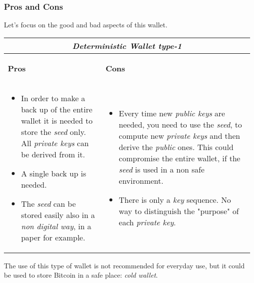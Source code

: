 \subsubsection{Pros and Cons}
Let's focus on the good and bad aspects of this wallet.

\begin{center}
	\begin{tabular}{ |p{6cm}|p{6cm}|  }
		\hline
		\multicolumn{2}{|c|}{\textbf{\textit{Deterministic Wallet type-1}}} \\
		\hline \hline 
		\begin{center}
			\textbf{Pros}
		\end{center}&\begin{center}
			\textbf{Cons}
		\end{center}\\
		\hline
		\begin{itemize}
			\item In order to make a back up of the entire wallet it is needed to store the \textit{seed} only. All \textit{private keys} can be derived from it.
			\item A single back up is needed.
			\item The \textit{seed} can be stored easily also in a \textit{non digital way}, in a paper for example.
		\end{itemize} &
		\begin{itemize}
			\item Every time new \textit{public keys} are needed, you need to use the \textit{seed}, to compute new \textit{private keys} and then derive the \textit{public} ones. This could compromise the entire wallet, if the \textit{seed} is used in a non safe environment.
			\item There is only a \textit{key} sequence. No way to distinguish the "purpose" of each \textit{private key}.
		\end{itemize}\\
		\hline
	\end{tabular}
\end{center}
The use of this type of wallet is not recommended for everyday use, but it could be used to store Bitcoin in a safe place: \textit{cold wallet}. 

